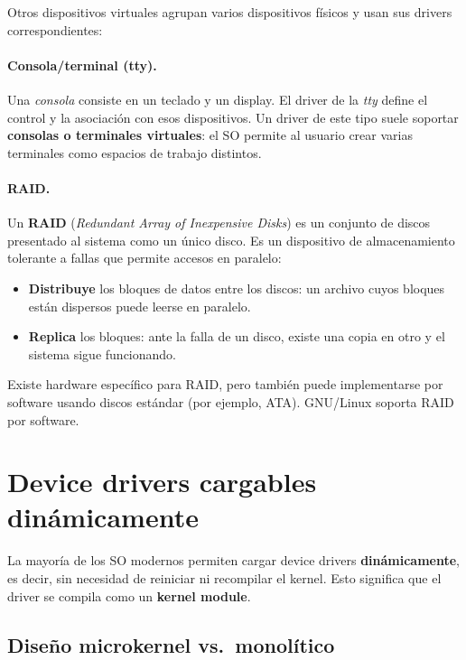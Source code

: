 \documentclass[11pt,a4paper]{article}
\begin{document}
Otros dispositivos virtuales agrupan varios dispositivos físicos y usan
sus drivers correspondientes:

\paragraph{Consola/terminal (tty).}
Una \emph{consola} consiste en un teclado y un display. El driver de la
\emph{tty} define el control y la asociación con esos dispositivos. Un
driver de este tipo suele soportar \textbf{consolas o terminales
virtuales}: el SO permite al usuario crear varias terminales como
espacios de trabajo distintos.

\paragraph{RAID.}
Un \textbf{RAID} (\emph{Redundant Array of Inexpensive Disks}) es un
conjunto de discos presentado al sistema como un único disco. Es un
dispositivo de almacenamiento tolerante a fallas que permite accesos
en paralelo:

\begin{itemize}[leftmargin=*,nosep]
    \item \textbf{Distribuye} los bloques de datos entre los discos:
        un archivo cuyos bloques están dispersos puede leerse en
        paralelo.
    \item \textbf{Replica} los bloques: ante la falla de un disco,
        existe una copia en otro y el sistema sigue funcionando.
\end{itemize}

Existe hardware específico para RAID, pero también puede implementarse
por software usando discos estándar (por ejemplo, ATA). GNU/Linux
soporta RAID por software.

\section{Device drivers cargables dinámicamente}

La mayoría de los SO modernos permiten cargar device drivers
\textbf{dinámicamente}, es decir, sin necesidad de reiniciar ni
recompilar el kernel. Esto significa que el driver se compila como un
\textbf{kernel module}.

\subsection{Diseño microkernel vs.\ monolítico}
\end{document}
